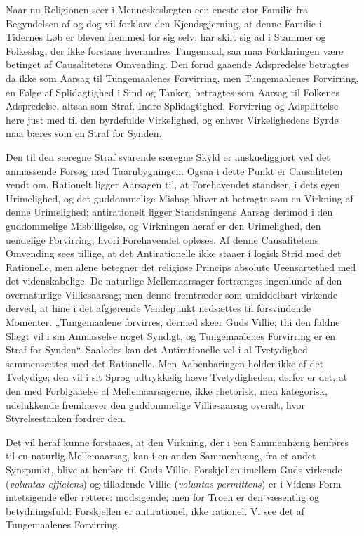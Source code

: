 \documentclass[12pt]{book}
\begin{document}
Naar nu Religionen seer i Menneskeslægten een eneste stor Familie
fra Begyndelsen af og dog vil forklare den Kjendsgjerning, at denne
Familie i Tidernes Løb er bleven fremmed for sig selv, har skilt sig
ad i Stammer og Folkeslag, der ikke forstaae hverandres Tungemaal,
saa maa Forklaringen være betinget af Causalitetens Omvending. Den
forud gaaende Adspredelse betragtes da ikke som Aarsag til
Tungemaalenes Forvirring, men Tungemaalenes Forvirring, en Følge af
Splidagtighed i Sind og Tanker, betragtes som Aarsag til Folkenes
Adspredelse, altsaa som Straf. Indre Splidagtighed, Forvirring og
Adsplittelse høre just med til den byrdefulde Virkelighed, og enhver
Virkelighedens Byrde maa bæres som en Straf for Synden.

Den til den særegne Straf svarende særegne Skyld er anskueliggjort
ved det anmassende Forsøg med Taarnbygningen. Ogsaa i dette Punkt er
Causaliteten vendt om. Rationelt ligger Aarsagen til, at
Forehavendet standser, i dets egen Urimelighed, og det guddommelige
Mishag bliver at betragte som en Virkning af denne Urimelighed;
antirationelt ligger Standsningens Aarsag derimod i den guddommelige
Misbilligelse, og Virkningen heraf er den Urimelighed, den uendelige
Forvirring, hvori Forehavendet opløses. Af denne Causalitetens
Omvending sees tillige, at det Antirationelle ikke staaer i logisk
Strid med det Rationelle, men alene betegner det religiøse Princips
absolute Ueensartethed med det videnskabelige.
De naturlige Mellemaarsager fortrænges ingenlunde af den
overnaturlige Villiesaarsag; men denne fremtræder som umiddelbart
virkende derved, at hine i det afgjørende Vendepunkt nedsættes til
forsvindende Momenter. „Tungemaalene forvirres, dermed skeer Guds
Villie; thi den faldne Slægt vil i sin Anmasselse noget Syndigt, og
Tungemaalenes Forvirring er en Straf for Synden“. Saaledes kan det
Antirationelle vel i al Tvetydighed sammensættes med det Rationelle.
Men Aabenbaringen holder ikke af det Tvetydige; den vil i sit Sprog
udtrykkelig hæve Tvetydigheden; derfor er det, at den med
Forbigaaelse af Mellemaarsagerne, ikke rhetorisk, men kategorisk,
udelukkende fremhæver den guddommelige Villiesaarsag overalt, hvor
Styrelsestanken fordrer den.

Det vil heraf kunne forstaaes, at den Virkning, der i een
Sammenhæng henføres til en naturlig Mellemaarsag, kan i en anden
Sammenhæng, fra et andet Synspunkt, blive at henføre til Guds
Villie. Forskjellen imellem Guds virkende (\textit{voluntas
efficiens}) og tilladende Villie (\textit{voluntas permittens}) er i
Videns Form intetsigende eller rettere: modsigende; men for Troen er
den væsentlig og betydningsfuld: Forskjellen er antirationel, ikke
rationel. Vi see det af Tungemaalenes Forvirring.
\end{document}
